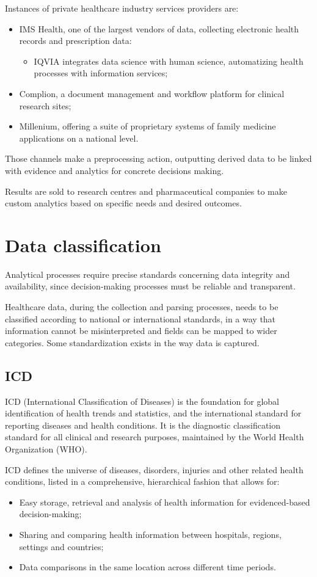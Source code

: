Instances of private healthcare industry services providers are:
\begin{itemize}
	\item IMS Health, one of the largest vendors of data, collecting electronic health records and prescription data:
	\begin{itemize}
		\item IQVIA integrates data science with human science, automatizing health processes with information services;
	\end{itemize}
	\item Complion, a document management and workflow platform for clinical research sites;
	\item Millenium, offering a suite of proprietary systems of family medicine applications on a national level.
\end{itemize}

Those channels make a preprocessing action, outputting derived data to be linked with evidence and analytics for concrete decisions making.

Results are sold to research centres and pharmaceutical companies to make custom analytics based on specific needs and desired outcomes. 

\section{Data classification}
Analytical processes require precise standards concerning data integrity and availability, since decision-making processes must be reliable and transparent.

Healthcare data, during the collection and parsing processes, needs to be classified according to national or international standards, in a way that information cannot be misinterpreted and fields can be mapped to wider categories. Some standardization exists in the way data is captured.

\subsection{ICD}
ICD (International Classification of Diseases) is the foundation for global identification of health trends and statistics, and the international standard for reporting diseases and health conditions. It is the diagnostic classification standard for all clinical and research purposes\cite{who}, maintained by the World Health Organization (WHO).

ICD defines the universe of diseases, disorders, injuries and other related health conditions, listed in a comprehensive, hierarchical fashion that allows for: 
\begin{itemize}
	\item Easy storage, retrieval and analysis of health information for evidenced-based decision-making;
	\item Sharing and comparing health information between hospitals, regions, settings and countries;
	\item Data comparisons in the same location across different time periods\cite{whoicd}.
\end{itemize}

